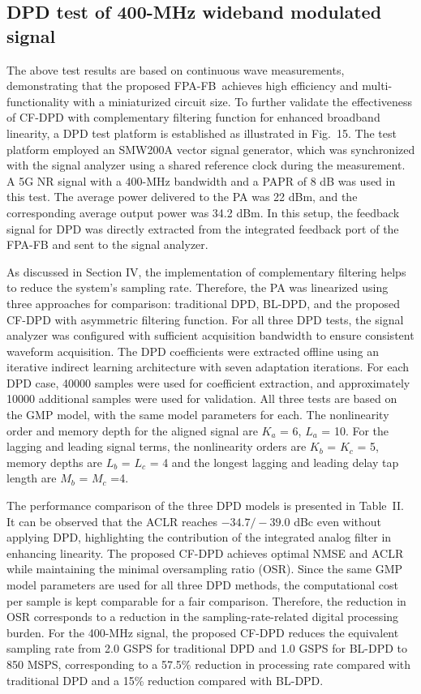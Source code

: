 \documentclass[twoside,twocolumn]{article}
\DeclareRobustCommand{\FPAFB}{FPA-FB}
\begin{document}
\subsection{DPD test of 400-MHz wideband modulated signal} 
The above test results are based on continuous wave measurements, demonstrating that the proposed \FPAFB\ achieves high efficiency and multi-functionality with a miniaturized circuit size. To further validate the effectiveness of CF-DPD with complementary filtering function for enhanced broadband linearity, a DPD test platform is established as illustrated in Fig.~15. The test platform employed an SMW200A vector signal generator, which was synchronized with the signal analyzer using a shared reference clock during the measurement. A 5G NR signal with a 400-MHz bandwidth and a PAPR of 8 dB was used in this test. The average power delivered to the PA was 22 dBm, and the corresponding average output power was 34.2 dBm. In this setup, the feedback signal for DPD was directly extracted from the integrated feedback port of the FPA-FB and sent to the signal analyzer.


As discussed in Section IV, the implementation of complementary filtering helps to reduce the system's sampling rate. Therefore, the PA was linearized using three approaches for comparison: traditional DPD, BL-DPD, and the proposed CF-DPD with asymmetric filtering function. For all three DPD tests, the signal analyzer was configured with sufficient acquisition bandwidth to ensure consistent waveform acquisition. The DPD coefficients were extracted offline using an iterative indirect learning architecture with seven adaptation iterations. For each DPD case, 40000 samples were used for coefficient extraction, and approximately 10000 additional samples were used for validation. All three tests are based on the GMP model, with the same model parameters for each. The nonlinearity order and memory depth for the aligned signal are $K_a$ = 6, $L_a$ = 10. For the lagging and leading signal terms, the nonlinearity orders are $K_b$ = $K_c$ = 5, memory depths are $L_b$ = $L_c$ = 4 and the longest lagging and leading delay tap length are  $M_b$ = $M_c$ =4.


The performance comparison of the three DPD models is presented in Table~II. It can be observed that the ACLR reaches $-34.7/-39.0$ dBc even without applying DPD, highlighting the contribution of the integrated analog filter in enhancing linearity. The proposed CF-DPD achieves optimal NMSE and ACLR while maintaining the minimal oversampling ratio (OSR). Since the same GMP model parameters are used for all three DPD methods, the computational cost per sample is kept comparable for a fair comparison. Therefore, the reduction in OSR corresponds to a reduction in the sampling-rate-related digital processing burden. For the 400-MHz signal, the proposed CF-DPD reduces the equivalent sampling rate from 2.0 GSPS for traditional DPD and 1.0 GSPS for BL-DPD to 850 MSPS, corresponding to a 57.5\% reduction in processing rate compared with traditional DPD and a 15\% reduction compared with BL-DPD.
\end{document}
